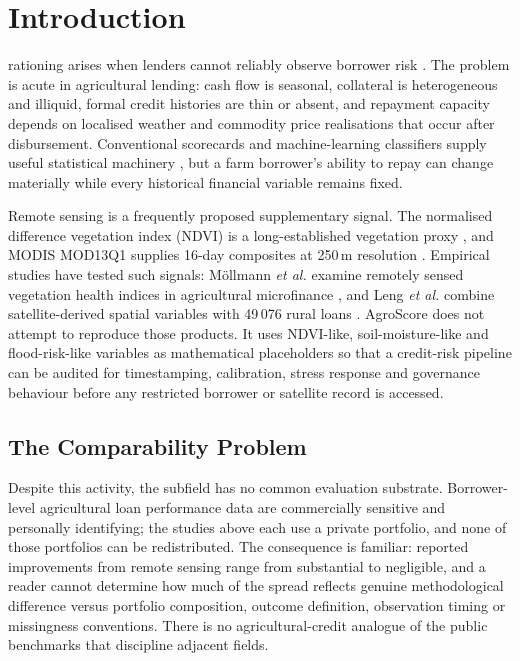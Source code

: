 \documentclass[journal]{IEEEtran}
\begin{document}
\IEEEpeerreviewmaketitle

\section{Introduction}
 rationing arises when lenders cannot reliably observe borrower risk \cite{stiglitz1981credit}. The problem is acute in agricultural lending: cash flow is seasonal, collateral is heterogeneous and illiquid, formal credit histories are thin or absent, and repayment capacity depends on localised weather and commodity price realisations that occur after disbursement. Conventional scorecards and machine-learning classifiers supply useful statistical machinery \cite{hand1997credit,thomas2000survey,crook2007developments,baesens2003benchmarking}, but a farm borrower's ability to repay can change materially while every historical financial variable remains fixed.

Remote sensing is a frequently proposed supplementary signal. The normalised difference vegetation index (NDVI) is a long-established vegetation proxy \cite{tucker1979ndvi}, and MODIS MOD13Q1 supplies 16-day composites at 250\,m resolution \cite{mod13q1}. Empirical studies have tested such signals: M\"ollmann \textit{et al.} examine remotely sensed vegetation health indices in agricultural microfinance \cite{mollmann2020vegetation}, and Leng \textit{et al.} combine satellite-derived spatial variables with 49\,076 rural loans \cite{leng2026satellite}. AgroScore does not attempt to reproduce those products. It uses NDVI-like, soil-moisture-like and flood-risk-like variables as mathematical placeholders so that a credit-risk pipeline can be audited for timestamping, calibration, stress response and governance behaviour before any restricted borrower or satellite record is accessed.

\subsection{The Comparability Problem}
Despite this activity, the subfield has no common evaluation substrate. Borrower-level agricultural loan performance data are commercially sensitive and personally identifying; the studies above each use a private portfolio, and none of those portfolios can be redistributed. The consequence is familiar: reported improvements from remote sensing range from substantial to negligible, and a reader cannot determine how much of the spread reflects genuine methodological difference versus portfolio composition, outcome definition, observation timing or missingness conventions. There is no agricultural-credit analogue of the public benchmarks that discipline adjacent fields.
\end{document}
